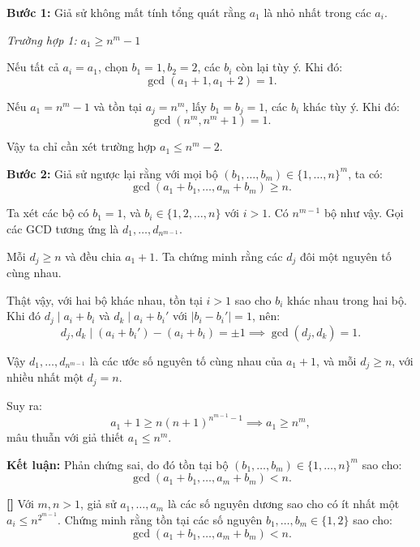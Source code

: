 \documentclass[../01-divisibility.tex]{subfiles}
\begin{document}
\begin{soln}\footnotemark
	\textbf{Bước 1:} Giả sử không mất tính tổng quát rằng \( a_1 \) là nhỏ nhất trong các \( a_i \).

	\textit{Trường hợp 1:} \( a_1 \geq n^m - 1 \)

	Nếu tất cả \( a_i = a_1 \), chọn \( b_1 = 1, b_2 = 2 \), các \( b_i \) còn lại tùy ý. Khi đó:
	\[
		\gcd(a_1 + 1, a_1 + 2) = 1.
	\]

	Nếu \( a_1 = n^m - 1 \) và tồn tại \( a_j = n^m \), lấy \( b_1 = b_j = 1 \), các \( b_i \) khác tùy ý. Khi đó:
	\[
		\gcd(n^m, n^m + 1) = 1.
	\]

	Vậy ta chỉ cần xét trường hợp \( a_1 \leq n^m - 2 \).

	\textbf{Bước 2:} Giả sử ngược lại rằng với mọi bộ \( (b_1, \dots, b_m) \in \{1, \dots, n\}^m \), ta có:
	\[
		\gcd(a_1 + b_1, \dots, a_m + b_m) \geq n.
	\]

	Ta xét các bộ có \( b_1 = 1 \), và \( b_i \in \{1, 2, \dots, n\} \) với \( i > 1 \). Có \( n^{m-1} \) bộ như vậy. Gọi các GCD tương ứng là \( d_1, \dots, d_{n^{m-1}} \).

	Mỗi \( d_j \geq n \) và đều chia \( a_1 + 1 \). Ta chứng minh rằng các \( d_j \) đôi một nguyên tố cùng nhau.

	Thật vậy, với hai bộ khác nhau, tồn tại \( i > 1 \) sao cho \( b_i \) khác nhau trong hai bộ. Khi đó \( d_j \mid a_i + b_i \) và \( d_k \mid a_i + b_i' \) với \( |b_i - b_i'| = 1 \), nên:
	\[
		d_j, d_k \mid (a_i + b_i') - (a_i + b_i) = \pm 1 \implies \gcd(d_j, d_k) = 1.
	\]

	Vậy \( d_1, \dots, d_{n^{m-1}} \) là các ước số nguyên tố cùng nhau của \( a_1 + 1 \), và mỗi \( d_j \geq n \), với nhiều nhất một \( d_j = n \). 

	Suy ra:
	\[
		a_1 + 1 \geq n(n+1)^{n^{m-1} - 1} \implies a_1 \geq n^m,
	\]
	mâu thuẫn với giả thiết \( a_1 \leq n^m \).

	\textbf{Kết luận:} Phản chứng sai, do đó tồn tại bộ \( (b_1, \dots, b_m) \in \{1, \dots, n\}^m \) sao cho:
	\[
		\gcd(a_1 + b_1, \dots, a_m + b_m) < n.
	\]
\end{soln}


\newpage

\begin{example*}\label{example:EGMO-2015-P3-strong}\textbf{[]}
	Với \( m, n > 1 \), giả sử \( a_1, \dots, a_m \) là các số nguyên dương sao cho có ít nhất một \( a_i \leq n^{2^{m-1}} \). 
	Chứng minh rằng tồn tại các số nguyên \( b_1, \dots, b_m \in \{1, 2\} \) sao cho:
	\[
		\gcd(a_1 + b_1, \dots, a_m + b_m) < n.
	\]
\end{example*}
\end{document}
